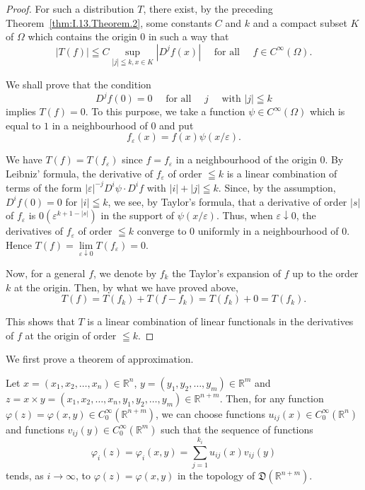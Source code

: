 \begin{proof}
 For such a distribution $T$, there exist, by the preceding Theorem~\ref{thm:I.13.Theorem.2}, some constants $C$ and $k$ and a compact subset $K$ of $\Omega$ which contains the origin $0$ in such a way that 
\[
\left| T (f) \right| \leqq C \sup\limits_{| j | \leqq k, x \in K} \left| D ^{j} f (x) \right| \quad \text{ for all } \quad f \in C ^{\infty} (\Omega). \]

We shall prove that the condition 
\[
D ^{j} f (0) = 0 \quad \text{ for all } \quad j \quad \text{ with } | j | \leqq k
\]
implies $T(f) = 0$. To this purpose, we take a function $\psi \in C^{\infty}(\Omega)$ which is equal to $1$ in a neighbourhood of $0$ and put 
\[
f_{\varepsilon} (x) = f (x) \psi (x / \varepsilon).
\]

We have $T(f) = T(f_{\varepsilon})$ since $f = f_{\varepsilon}$ in a neighbourhood of the origin $0$. By Leibniz' formula, the derivative of $f_{\varepsilon}$ of order $\leqq k$ is a linear combination of terms of the form $|\varepsilon|^{-j}D^{i}\psi \cdot D^{i}f$ with $|i| + |j| \leqq k$. Since, by the assumption, $D^{i}f(0) = 0$ for $|i| \leqq k$, we see, by Taylor's formula, that a derivative of order $|s|$ of $f_{\varepsilon}$ is $0(\varepsilon^{k+1-|s|})$ in the support of $\psi (x / \varepsilon)$. Thus, when $\varepsilon \downarrow 0$, the derivatives of $f_{\varepsilon}$ of order $\leqq k$ converge to $0$ uniformly in a neighbourhood of $0$. Hence $T(f) = \lim\limits_{\varepsilon \downarrow 0}T(f_{\varepsilon}) = 0$. 

Now, for a general $f$, we denote by $f_k$ the Taylor's expansion of $f$ up to the order $k$ at the origin. Then, by what we have proved above, 
\[
T (f) = T \left(f_{k}\right) + T \left(f- f_{k}\right) = T \left(f_{k}\right) + 0 = T \left(f_{k}\right).
\]

This shows that $T$ is a linear combination of linear functionals in the derivatives of $f$ at the origin of order $\leqq k$. 
\end{proof}


\label{sec:I.14}

We first prove a theorem of approximation. 

\begin{theorem}\label{thm:I.14.Theorem.1} Let $x = (x_{1}, x_{2}, \ldots, x_{n}) \in \mathbb{R}^{n}$, $y = (y_{1}, y_{2}, \ldots, y_{m}) \in \mathbb{R}^{m}$ and $z = x \times y = (x_{1}, x_{2}, \ldots, x_{n}, y_{1}, y_{2}, \ldots, y_{m}) \in \mathbb{R}^{n+m}$. Then, for any function $\varphi(z) = \varphi(x, y) \in C_{0}^{\infty}(\mathbb{R}^{n+m})$, we can choose functions $u_{ij}(x) \in C_{0}^{\infty}(\mathbb{R}^{n})$ and functions $v_{ij}(y) \in C_{0}^{\infty}(\mathbb{R}^{m})$ such that the sequence of functions 
\begin{equation}\label{eq:I.14.1}
\varphi_{i} (z) = \varphi_{i} (x, y) = \sum\limits_{j=1} ^ {k_{i}} u_{ij} (x) v_{ij} (y)
\end{equation}
tends, as $i \to \infty$, to $\varphi(z) = \varphi(x, y)$ in the topology of $\mathfrak{D}(\mathbb{R}^{n+m})$. 
\end{theorem}

